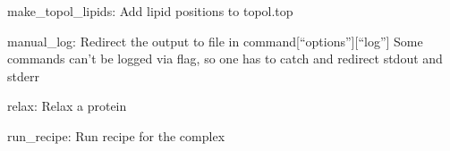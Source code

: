 \documentclass[letterpaper,10pt,english]{sphinxmanual}
\begin{document}
\begin{fulllineitems}
\begin{fulllineitems}
\end{fulllineitems}


\begin{fulllineitems}
\label{\detokenize{gromacs:gromacs.Gromacs.make_topol_lipids}}
\pysigstartsignatures
{}
\pysigstopsignatures
\sphinxAtStartPar
make\_topol\_lipids: Add lipid positions to topol.top

\end{fulllineitems}


\begin{fulllineitems}
\label{\detokenize{gromacs:gromacs.Gromacs.manual_log}}
\pysigstartsignatures
{}
\pysigstopsignatures
\sphinxAtStartPar
manual\_log: Redirect the output to file in command{[}“options”{]}{[}“log”{]}
Some commands can’t be logged via flag, so one has to catch and
redirect stdout and stderr

\end{fulllineitems}


\begin{fulllineitems}
\label{\detokenize{gromacs:gromacs.Gromacs.relax}}
\pysigstartsignatures
{}
\pysigstopsignatures
\sphinxAtStartPar
relax: Relax a protein

\end{fulllineitems}


\begin{fulllineitems}
\label{\detokenize{gromacs:gromacs.Gromacs.run_recipe}}
\pysigstartsignatures
{}
\pysigstopsignatures
\sphinxAtStartPar
run\_recipe: Run recipe for the complex


\end{fulllineitems}
\end{fulllineitems}
\end{document}
